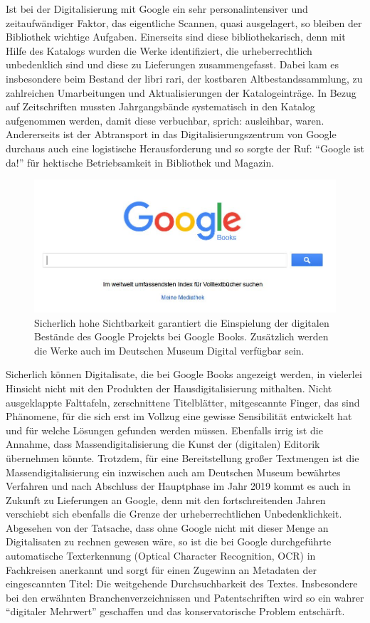 \documentclass[a4paper,
fontsize=11pt,
oneside,
numbers=noperiodatend,
parskip=half-,
bibliography=totoc,
final
]{scrartcl}
\begin{document}
Ist bei der Digitalisierung mit Google ein sehr personalintensiver und
zeitaufwändiger Faktor, das eigentliche Scannen, quasi ausgelagert, so
bleiben der Bibliothek wichtige Aufgaben. Einerseits sind diese
bibliothekarisch, denn mit Hilfe des Katalogs wurden die Werke
identifiziert, die urheberrechtlich unbedenklich sind und diese zu
Lieferungen zusammengefasst. Dabei kam es insbesondere beim Bestand der
libri rari, der kostbaren Altbestandssammlung, zu zahlreichen
Umarbeitungen und Aktualisierungen der Katalogeinträge. In Bezug auf
Zeitschriften mussten Jahrgangsbände systematisch in den Katalog
aufgenommen werden, damit diese verbuchbar, sprich: ausleihbar, waren.
Andererseits ist der Abtransport in das Digitalisierungszentrum von
Google durchaus auch eine logistische Herausforderung und so sorgte der
Ruf: \enquote{Google ist da!} für hektische Betriebsamkeit in Bibliothek
und Magazin.

\begin{figure}
\centering
\includegraphics[width=.70\textwidth]{img/Abb6.jpg}
\caption{Sicherlich hohe Sichtbarkeit garantiert die Einspielung der
digitalen Bestände des Google Projekts bei Google Books. Zusätzlich
werden die Werke auch im Deutschen Museum Digital verfügbar sein.}
\end{figure}

Sicherlich können Digitalisate, die bei Google Books angezeigt werden,
in vielerlei Hinsicht nicht mit den Produkten der Hausdigitalisierung
mithalten. Nicht ausgeklappte Falttafeln, zerschnittene Titelblätter,
mitgescannte Finger, das sind Phänomene, für die sich erst im Vollzug
eine gewisse Sensibilität entwickelt hat und für welche Lösungen
gefunden werden müssen. Ebenfalls irrig ist die Annahme, dass
Massendigitalisierung die Kunst der (digitalen) Editorik übernehmen
könnte. Trotzdem, für eine Bereitstellung großer Textmengen ist die
Massendigitalisierung ein inzwischen auch am Deutschen Museum bewährtes
Verfahren und nach Abschluss der Hauptphase im Jahr 2019 kommt es auch
in Zukunft zu Lieferungen an Google, denn mit den fortschreitenden
Jahren verschiebt sich ebenfalls die Grenze der urheberrechtlichen
Unbedenklichkeit. Abgesehen von der Tatsache, dass ohne Google nicht mit
dieser Menge an Digitalisaten zu rechnen gewesen wäre, so ist die bei
Google durchgeführte automatische Texterkennung (Optical Character
Recognition, OCR) in Fachkreisen anerkannt und sorgt für einen Zugewinn
an Metadaten der eingescannten Titel: Die weitgehende Durchsuchbarkeit
des Textes. Insbesondere bei den erwähnten Branchenverzeichnissen und
Patentschriften wird so ein wahrer \enquote{digitaler Mehrwert}
geschaffen und das konservatorische Problem entschärft.
\end{document}
